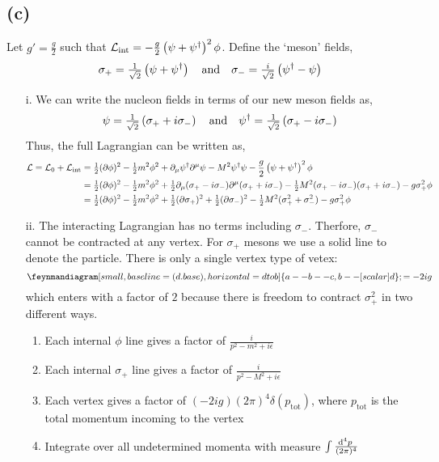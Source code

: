 \documentclass[12pt]{extarticle}
\begin{document}
\begin{enumerate}
\end{enumerate}

\subsection*{(c)}
Let $g' = \frac{g}{2}$ such that $\mathcal{L}_{\mathrm{int}} = - \frac{g}{2} \left( \psi + \psi^\dagger \right)^2 \phi$. Define the `meson' fields,
\[\sigma_{+} = \tfrac{1}{\sqrt{2}} \left( \psi + \psi^\dagger \right) \quad \text{and} \quad \sigma_{-} = \tfrac{i}{\sqrt{2}} \left( \psi^\dagger - \psi \right)\]
\begin{enumerate}
\item[i.] 
We can write the nucleon fields in terms of our new meson fields as,
\[ \psi = \tfrac{1}{\sqrt{2}} \left( \sigma_{+} + i \sigma_{-} \right) \quad \text{and} \quad \psi^\dagger = \tfrac{1}{\sqrt{2}} \left( \sigma_{+} - i \sigma_{-} \right) \]
Thus, the full Lagrangian can be written as,
\begin{align*}
\mathcal{L} = \mathcal{L}_0 + \mathcal{L}_{\mathrm{int}} & = \tfrac{1}{2} (\partial \phi)^2 - \tfrac{1}{2} m^2 \phi^2 + \partial_\mu \psi^\dagger \partial^\mu \psi - M^2 \psi^\dagger \psi - \frac{g}{2} \left( \psi + \psi^\dagger \right)^2 \phi 
\\
& = \tfrac{1}{2} (\partial \phi)^2 - \tfrac{1}{2} m^2 \phi^2 + \tfrac{1}{2}\partial_\mu (\sigma_{+} - i \sigma_{-}) \partial^\mu (\sigma_{+} + i \sigma_{-}) - \tfrac{1}{2} M^2 (\sigma_{+} - i \sigma_{-})(\sigma_{+} + i \sigma_{-}) - g \sigma_{+}^2 \phi 
\\
& = \tfrac{1}{2} (\partial \phi)^2 - \tfrac{1}{2} m^2 \phi^2 + \tfrac{1}{2}(\partial \sigma_+)^2 + \tfrac{1}{2} (\partial \sigma_{-})^2 - \tfrac{1}{2} M^2 (\sigma_{+}^2 + \sigma_{-}^2) - g \sigma_{+}^2 \phi 
\end{align*}
\item[ii.]
The interacting Lagrangian has no terms including $\sigma_-$. Therfore, $\sigma_-$ cannot be contracted at any vertex. For $\sigma_+$ mesons we use a solid line to denote the particle. There is only a single vertex type of vetex:
	\begin{equation*}
	\feynmandiagram [small, baseline=(d.base), horizontal=d to b] {
	a -- b -- c,
	b -- [scalar] d
	};
	= - 2i g
	\end{equation*}
	\renewcommand{\theenumiii}{(\roman{enumiii})}
	which enters with a factor of $2$ because there is freedom to contract $\sigma_+^2$ in two different ways.
	\begin{enumerate}
	\item Each internal $\phi$ line gives a factor of $\frac{i}{p^2 - m^2 + i \epsilon}$
	\item Each internal $\sigma_+$ line gives a factor of $\frac{i}{p^2 - M^2 + i \epsilon}$
	\item Each vertex gives a factor of $(-2ig) (2\pi)^4 \delta(p_\text{tot}) $, where
	$p_\text{tot}$ is the total momentum incoming to the vertex
	\item Integrate over all undetermined momenta with measure $\int \frac{\mathrm{d}^4p \:}{(2\pi)^4}$
	\end{enumerate}


\end{enumerate}
\end{document}
